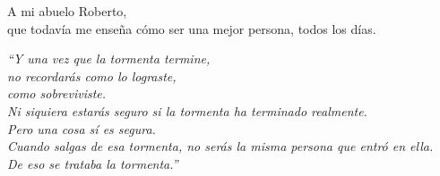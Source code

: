 \blankpage

\begin{flushright}
A mi abuelo Roberto,\\
que todavía me enseña cómo ser una mejor persona, todos los días.

\vspace*{\fill}

\textit{
``Y una vez que la tormenta termine,\\
no recordarás como lo lograste,\\
como sobreviviste.\\
Ni siquiera estarás seguro si la tormenta ha terminado realmente.\\
Pero una cosa sí es segura.\\
Cuando salgas de esa tormenta, no serás la misma persona que entró en ella.\\
De eso se trataba la tormenta.''\\
}
\end{flushright}

